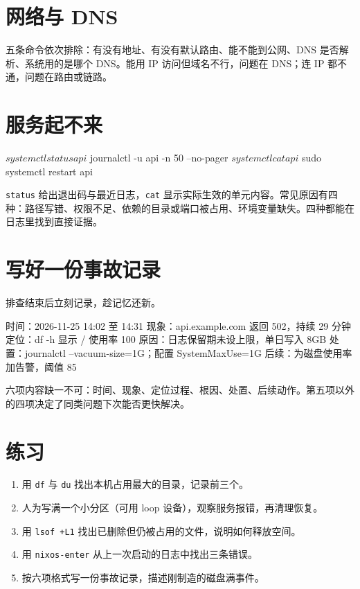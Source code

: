 \section{网络与 DNS}


五条命令依次排除：有没有地址、有没有默认路由、能不能到公网、DNS 是否解析、系统用的是哪个 DNS。能用 IP 访问但域名不行，问题在 DNS；连 IP 都不通，问题在路由或链路。

\section{服务起不来}

\begin{shellsession}
$ systemctl status api
$ journalctl -u api -n 50 --no-pager
$ systemctl cat api
$ sudo systemctl restart api
\end{shellsession}

\texttt{status} 给出退出码与最近日志，\texttt{cat} 显示实际生效的单元内容。常见原因有四种：路径写错、权限不足、依赖的目录或端口被占用、环境变量缺失。四种都能在日志里找到直接证据。

\section{写好一份事故记录}

排查结束后立刻记录，趁记忆还新。

\begin{textcode}
时间：2026-11-25 14:02 至 14:31
现象：api.example.com 返回 502，持续 29 分钟
定位：df -h 显示 / 使用率 100%
原因：日志保留期未设上限，单日写入 8GB
处置：journalctl --vacuum-size=1G；配置 SystemMaxUse=1G
后续：为磁盘使用率加告警，阈值 85%
\end{textcode}

六项内容缺一不可：时间、现象、定位过程、根因、处置、后续动作。第五项以外的四项决定了同类问题下次能否更快解决。

\section{练习}

\begin{enumerate}
  \item 用 \texttt{df} 与 \texttt{du} 找出本机占用最大的目录，记录前三个。
  \item 人为写满一个小分区（可用 loop 设备），观察服务报错，再清理恢复。
  \item 用 \texttt{lsof +L1} 找出已删除但仍被占用的文件，说明如何释放空间。
  \item 用 \texttt{nixos-enter} 从上一次启动的日志中找出三条错误。
  \item 按六项格式写一份事故记录，描述刚制造的磁盘满事件。
\end{enumerate}

